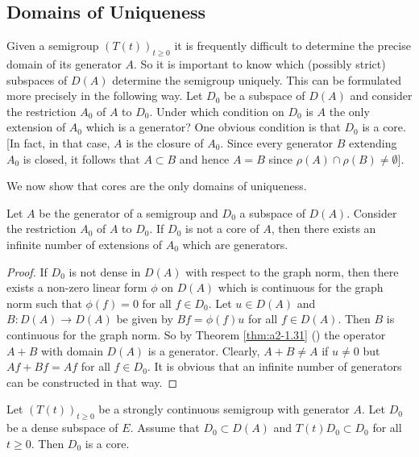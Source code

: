 \subsection{Domains of Uniqueness} \label{subsec:a2-1.se9}
Given a semigroup $(T(t))_{t \geq 0}$ 
it is frequently difficult to determine the precise domain of its generator $A$.
So it is important to know which (possibly strict) subspaces of $D(A)$ determine the semigroup uniquely.
This can be formulated more precisely in the following way.
Let $D_{0}$ be a subspace of $D(A)$ and consider the restriction $A_{0}$ of $A$ to $D_{0}$.
Under which condition on $D_{0}$ is $A$ the only extension of $A_{0}$ which is a generator?
One obvious condition is that $D_{0}$ is a core.
[In fact, in that case, $A$ is the closure of $A_{0}$.
Since every generator $B$ extending $A_{0}$ is closed, it follows that $A \subset B$ and hence $A = B$ since 
$\rho(A) \cap \rho(B) \neq \emptyset$].

We now show that cores are the only domains of uniqueness.

\begin{theorem}\label{thm:a2-1.33}
Let $A$ be the generator of a semigroup and $D_{0}$ a subspace of $D(A)$.
Consider the restriction $A_{0}$ of $A$ to $D_{0}$.
If $D_{0}$ is not a core of $A$, then there exists an infinite number of extensions of $A_{0}$ which are generators.
\end{theorem}
\begin{proof}
If $D_{0}$ is not dense in $D(A)$ with respect to the graph norm, then there exists a non-zero linear form $\phi$ on $D(A)$ which is continuous for the graph norm such that $\phi(f) = 0$ for all $f \in D_{0}$.
Let $u \in D(A)$ and $B \colon D(A) \to D(A)$ be given by $Bf = \phi(f)u$ for all $f \in D(A)$.
Then $B$ is continuous for the graph norm.
So by Theorem \ref{thm:a2-1.31} () the operator $A+B$ with domain $D(A)$ is a generator.
Clearly, $A+B \neq A$ if $u \neq 0$ but $Af+Bf = Af$ for all $f \in D_{0}$.
It is obvious that an infinite number of generators can be constructed in that way.
\end{proof}

\begin{corollary}\label{cor:a2-1.34}
Let $(T(t))_{t\geq 0}$ be a strongly continuous semigroup with generator $A$.
Let $D_{0}$ be a dense subspace of $E$.
Assume that $D_{0} \subset D(A)$ and $T(t)D_{0} \subset D_{0}$ for all $t \geq 0$.
Then $D_{0}$ is a core.
\end{corollary}

